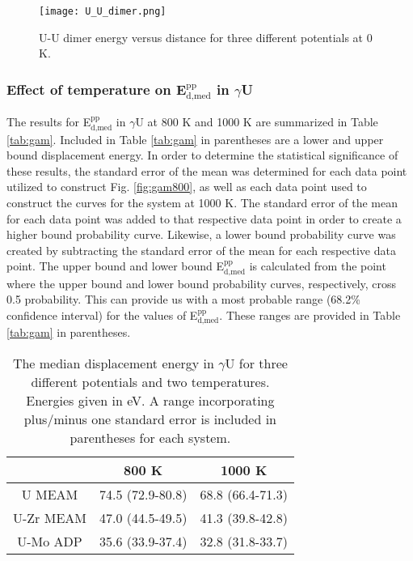 \documentclass[review]{elsarticle}
\begin{document}
\begin{figure}[h]
 \centering
 \texttt{[image: U\_U\_dimer.png]} 
 \caption{U-U dimer energy versus distance for three different potentials at 0 K.}
 \label{fig:dimer}
\end{figure}


\subsubsection{Effect of temperature on E$^{\textrm{pp}}_{\textrm{d,med}}$ in $\gamma$U}

The results for E$^{\textrm{pp}}_{\textrm{d,med}}$ in $\gamma$U at 800 K and 1000 K are summarized in Table \ref{tab:gam}. Included in Table \ref{tab:gam} in parentheses are a lower and upper bound displacement energy. In order to determine the statistical significance of these results, the standard error of the mean was determined for each data point utilized to construct Fig. \ref{fig:gam800}, as well as each data point used to construct the curves for the system at 1000 K. The standard error of the mean for each data point was added to that respective data point in order to create a higher bound probability curve. Likewise, a lower bound probability curve was created by subtracting the standard error of the mean for each respective data point. The upper bound and lower bound E$^{\textrm{pp}}_{\textrm{d,med}}$ is calculated from the point where the upper bound and lower bound probability curves, respectively, cross 0.5 probability. This can provide us with a most probable range (68.2\% confidence interval) for the values of E$^{\textrm{pp}}_{\textrm{d,med}}$. These ranges are provided in Table \ref{tab:gam} in parentheses. 

\begin{table}[h]
\caption{The median displacement energy in $\gamma$U for three different potentials and two temperatures. Energies given in eV. A range incorporating plus/minus one standard error is included in parentheses for each system.} \label{tab:gam}
\begin{center}
\begin{tabular}{|c|c|c|}
	\hline
	& 800 K & 1000 K \\
	 \hline
	 U MEAM & 74.5 (72.9-80.8) & 68.8 (66.4-71.3) \\
	 U-Zr MEAM & 47.0 (44.5-49.5) & 41.3 (39.8-42.8) \\
	 U-Mo ADP & 35.6 (33.9-37.4) & 32.8 (31.8-33.7) \\
	 \hline
\end{tabular}
\end{center}
\label{default}
\end{table}
\end{document}
